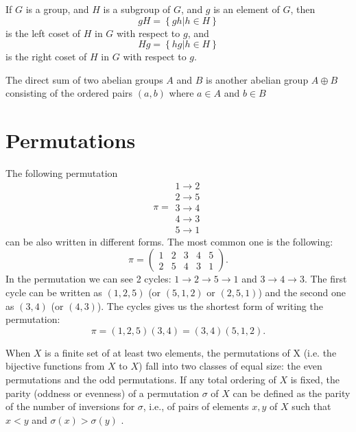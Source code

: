 \begin{appendices}
\begin{definition}[Coset]
  If $G$ is a group, and $H$ is a subgroup of $G$, and $g$ is an
  element of $G$, then
  \[
  gH = \left\{ gh \vert h \in H\right\}
  \]
  is the left coset of $H$ in $G$ with respect to $g$, and
  \[
  Hg = \left\{ hg \vert h \in H\right\}
  \]
  is the right coset of $H$ in $G$ with respect to $g$.
  \label{def:coset}
\end{definition}

\begin{definition}
  The direct sum of two abelian groups $A$ and
  $B$ is another abelian group $A \oplus B$ consisting of the ordered
  pairs
  $\left(a, b\right)$ where $a \in A$ and $b \in B$ \cite{wiki:directsum}
  \label{def:directsum}
\end{definition}
  
\section{Permutations}

\begin{example}[Permutation]
  The following permutation
  \[ \pi = 
    \begin{array}{c}
    1 \to 2 \\
    2 \to 5 \\
    3 \to 4 \\
    4 \to 3 \\
    5 \to 1 
    \end{array}
    \]
    can be also written in different forms. The most common one is the following:
    \[
    \pi = \begin{pmatrix}
      1 & 2 & 3 & 4 & 5 \\
      2 & 5 & 4 & 3 & 1
    \end{pmatrix}.
    \]
    In the permutation we can see 2 cycles:
    $1 \to 2 \to 5 \to 1$ and $3 \to 4 \to 3$. The first cycle can be
    written as $(1,2,5)$ (or $(5,1,2)$ or $(2,5,1)$) and the second
    one as $(3,4)$ (or $(4,3)$). The cycles gives us the shortest form
    of writing the permutation:
    \[
    \pi = (1,2,5)(3,4) = (3,4)(5,1,2).
    \]
  \label{ex:permutation}
\end{example}

\begin{definition}
  When $X$ is a finite set of at least two elements, the permutations of
  X (i.e. the bijective functions from $X$ to $X$) fall into two classes
  of equal size: the even permutations and the odd permutations. If
  any total ordering of $X$ is fixed, the parity (oddness or evenness)
  of a permutation $\sigma$ of $X$ can be defined as the
  parity of the number of inversions for $\sigma$, i.e., of pairs of elements
  $x, y$ of $X$ such that $x < y$ and $\sigma (x) > \sigma (y)$
  \cite{wiki:paritypermutation}.
  \label{def:paritypermutation}
\end{definition}


\end{appendices}
